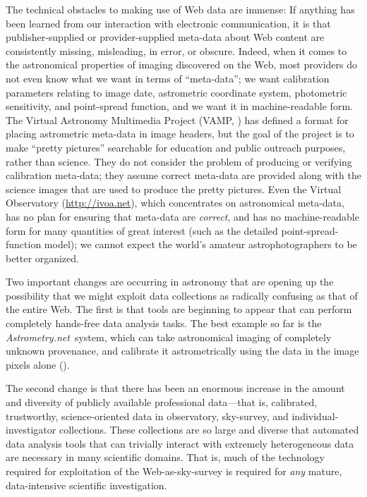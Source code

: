 \documentclass[12pt,preprint]{aastex}
\newcommand{\project}[1]{\textsl{#1}}
\newcommand{\An}{\project{Astrometry.net}}
\begin{document}
The technical obstacles to making use of Web data are immense: If
anything has been learned from our interaction with electronic
communication, it is that publisher-supplied or provider-supplied
meta-data about Web content are consistently missing, misleading, in
error, or obscure.  Indeed, when it comes to the astronomical
properties of imaging discovered on the Web, most providers do not
even know what we want in terms of ``meta-data''; we want calibration
parameters relating to image date, astrometric coordinate system,
photometric sensitivity, and point-spread function, and we want it in
machine-readable form.  The Virtual Astronomy Multimedia Project
(VAMP, \citealt{vamp}) has defined a format for placing astrometric
meta-data in image headers, but the goal of the project is to make
``pretty pictures'' searchable for education and public outreach
purposes, rather than science.  They do not consider the problem of
producing or verifying calibration meta-data; they assume correct
meta-data are provided along with the science images that are used to
produce the pretty pictures.  Even the Virtual Observatory
(\url{http://ivoa.net}), which concentrates on astronomical meta-data,
has no plan for ensuring that meta-data are \emph{correct}, and has no
machine-readable form for many quantities of great interest (such as
the detailed point-spread-function model); we cannot expect the
world's amateur astrophotographers to be better organized.

Two important changes are occurring in astronomy that are opening up
the possibility that we might exploit data collections as radically
confusing as that of the entire Web.  The first is that tools are
beginning to appear that can perform completely hands-free data
analysis tasks.  The best example so far is the
\An\ system, which can take astronomical imaging of
completely unknown provenance, and calibrate it astrometrically using
the data in the image pixels alone (\citealt{An}).

The second change is that there has been an enormous increase in the
amount and diversity of publicly available professional data---that
is, calibrated, trustworthy, science-oriented data in observatory,
sky-survey, and individual-investigator collections.  These
collections are so large and diverse that automated data analysis
tools that can trivially interact with extremely heterogeneous data
are necessary in many scientific domains.  That is, much of the
technology required for exploitation of the Web-as-sky-survey is
required for \emph{any} mature, data-intensive scientific
investigation.
\end{document}
